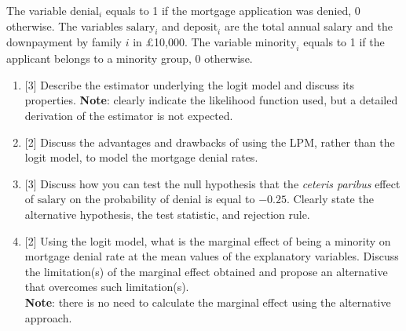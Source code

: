 \documentclass[12pt]{article}
\begin{document}
\begin{enumerate}
    The variable $\text{denial}_i$ equals to 1 if the mortgage application was denied, 0 otherwise. The variables $\text{salary}_i$ and $\text{deposit}_i$ are the total annual salary and the downpayment by family $i$ in \pounds 10,000. The variable $\text{minority}_i$ equals to 1 if the applicant belongs to a minority group, 0 otherwise.
    
    \begin{enumerate}
        \item {[3]} Describe the estimator underlying the logit model and discuss its properties. 
        \textbf{Note}: clearly indicate the likelihood function used, but a detailed derivation of the estimator is not expected. 
        
        \item {[2]} Discuss the advantages and drawbacks of using the LPM, rather than the logit model, to model the mortgage denial rates. 
        
        \item {[3]} Discuss how you can test the null hypothesis that the \textit{ceteris paribus} effect of $\text{salary}$ on the probability of denial is equal to $-0.25$. 
        Clearly state the alternative hypothesis, the test statistic, and rejection rule. 
        
        \item {[2]} Using the logit model, what is the marginal effect of being a minority on mortgage denial rate at the mean values of the explanatory variables. 
        Discuss the limitation(s) of the marginal effect obtained and propose an alternative that overcomes such limitation(s). \\ 
        \textbf{Note}: there is no need to calculate the marginal effect using the alternative approach. 
    \end{enumerate}




\end{enumerate}
\end{document}
